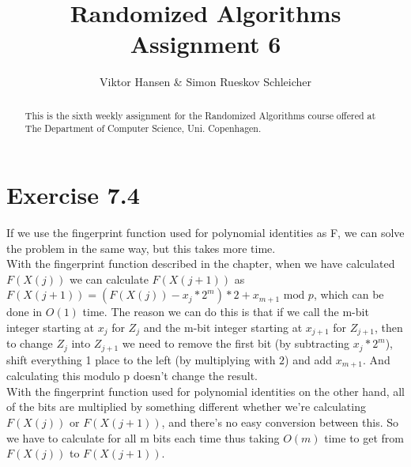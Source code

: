 \documentclass[12pt]{article}
\begin{document}
\nocite{*}


\title{Randomized Algorithms \\
       Assignment 6}

\author{Viktor Hansen \& Simon Rueskov Schleicher}

\maketitle

\begin{abstract}
  This is the sixth weekly assignment for the Randomized Algorithms course offered at The Department of Computer Science, Uni. Copenhagen.
\end{abstract}

\pagebreak


\section*{Exercise 7.4}
If we use the fingerprint function used for polynomial identities as F, we can solve the problem in the same way, but this takes more time.\\
With the fingerprint function described in the chapter, when we have calculated $F(X(j))$ we can calculate $F(X(j+1))$ as $F(X(j+1))=(F(X(j))-x_j*2^m)*2+x_{m+1}\text{ mod }p$, which can be done in $O(1)$ time. The reason we can do this is that if we call the m-bit integer starting at $x_j$ for $Z_j$ and the m-bit integer starting at $x_{j+1}$ for $Z_{j+1}$, then to change $Z_j$ into $Z_{j+1}$ we need to remove the first bit (by subtracting $x_j*2^m$), shift everything 1 place to the left (by multiplying with $2$) and add $x_{m+1}$. And calculating this modulo p doesn't change the result.\\
With the fingerprint function used for polynomial identities on the other hand, all of the bits are multiplied by something different whether we're calculating $F(X(j))$ or $F(X(j+1))$, and there's no easy conversion between this. So we have to calculate for all m bits each time thus taking $O(m)$ time to get from $F(X(j))$ to $F(X(j+1))$.
\end{document}
